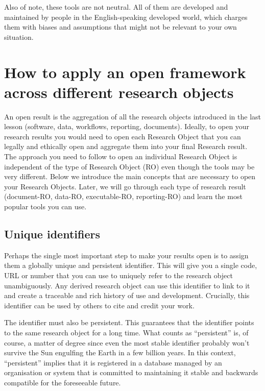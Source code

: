 \documentclass[
  letterpaper,
  DIV=11,
  numbers=noendperiod]{scrreport}
\begin{document}
Also of note, these tools are not neutral. All of them are developed and
maintained by people in the English-speaking developed world, which
charges them with biases and assumptions that might not be relevant to
your own situation.

\hypertarget{how-to-apply-an-open-framework-across-different-research-objects}{%
\section{How to apply an open framework across different research
objects}\label{how-to-apply-an-open-framework-across-different-research-objects}}

An open result is the aggregation of all the research objects introduced
in the last lesson (software, data, workflows, reporting, documents).
Ideally, to open your research results you would need to open each
Research Object that you can legally and ethically open and aggregate
them into your final Research result. The approach you need to follow to
open an individual Research Object is independent of the type of
Research Object (RO) even though the tools may be very different. Below
we introduce the main concepts that are necessary to open your Research
Objects. Later, we will go through each type of research result
(document-RO, data-RO, executable-RO, reporting-RO) and learn the most
popular tools you can use.

\hypertarget{unique-identifiers}{%
\subsection{Unique identifiers}\label{unique-identifiers}}

Perhaps the single most important step to make your results open is to
assign them a globally unique and persistent identifier. This will give
you a single code, URL or number that you can use to uniquely refer to
the research object unambiguously. Any derived research object can use
this identifier to link to it and create a traceable and rich history of
use and development. Crucially, this identifier can be used by others to
cite and credit your work.

The identifier must also be persistent. This guarantees that the
identifier points to the same research object for a long time. What
counts as ``persistent'' is, of course, a matter of degree since even
the most stable identifier probably won't survive the Sun engulfing the
Earth in a few billion years. In this context, ``persistent'' implies
that it is registered in a database managed by an organisation or system
that is committed to maintaining it stable and backwards compatible for
the foreseeable future.
\end{document}
